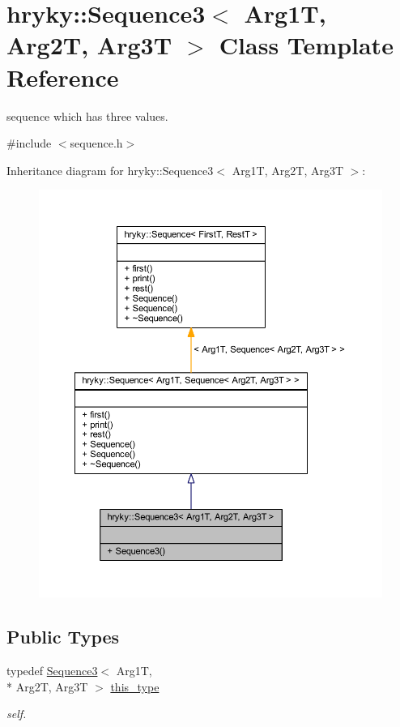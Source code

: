\hypertarget{classhryky_1_1_sequence3}{\section{hryky\-:\-:Sequence3$<$ Arg1\-T, Arg2\-T, Arg3\-T $>$ Class Template Reference}
\label{classhryky_1_1_sequence3}
}


sequence which has three values.  




{\ttfamily \#include $<$sequence.\-h$>$}



Inheritance diagram for hryky\-:\-:Sequence3$<$ Arg1\-T, Arg2\-T, Arg3\-T $>$\-:\nopagebreak
\begin{figure}[H]
\begin{center}
\leavevmode
\includegraphics[width=350pt]{classhryky_1_1_sequence3__inherit__graph}
\end{center}
\end{figure}
\subsection*{Public Types}
\begin{DoxyCompactItemize}
\item 
\hypertarget{classhryky_1_1_sequence3_abf8d5757d430fa46f0569253fe17dc74}{typedef \hyperlink{classhryky_1_1_sequence3}{Sequence3}$<$ Arg1\-T, \\*
Arg2\-T, Arg3\-T $>$ \hyperlink{classhryky_1_1_sequence3_abf8d5757d430fa46f0569253fe17dc74}{this\-\_\-type}}\label{classhryky_1_1_sequence3_abf8d5757d430fa46f0569253fe17dc74}

\begin{DoxyCompactList}\small\item\em self. \end{DoxyCompactList}\end{DoxyCompactItemize}
